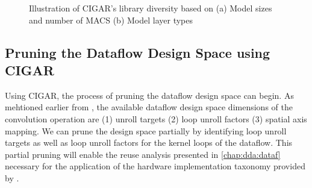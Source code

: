 \begin{figure}
    \centering
    \caption{Illustration of CIGAR's library diversity based on (a) Model sizes and number of MACS (b) Model layer types}
    \label{fig:cigar_library_overview}
\end{figure}

\clearpage

\subsection{Pruning the Dataflow Design Space using CIGAR}
\label{chap:dda:dataflow_dse:pruning:applying_it}

Using CIGAR, the process of pruning the dataflow design space can begin. As
mehtioned earlier from \cite{dnn_df_overrated}, the available dataflow design
space dimensions of the convolution operation are (1) unroll targets (2) loop
unroll factors (3) spatial axis mapping. We can prune the design space partially by
identifying loop unroll targets as well as loop unroll factors for the kernel
loops of the dataflow. This partial pruning will enable the reuse
analysis presented in \autoref{chap:dda:dataf} necessary for the application of the hardware implementation taxonomy
provided by \cite{maestro}.

